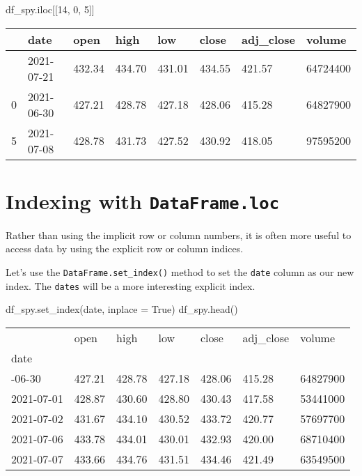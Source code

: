 \documentclass[
  letterpaper,
  DIV=11,
  numbers=noendperiod]{scrreprt}
\newenvironment{Shaded}{\begin{snugshade}}{\end{snugshade}}
\newcommand{\DecValTok}[1]{\textcolor[rgb]{0.68,0.00,0.00}{#1}}
\newcommand{\NormalTok}[1]{\textcolor[rgb]{0.00,0.23,0.31}{#1}}
\newcommand{\OperatorTok}[1]{\textcolor[rgb]{0.37,0.37,0.37}{#1}}
\newcommand{\StringTok}[1]{\textcolor[rgb]{0.13,0.47,0.30}{#1}}
\newcommand{\VariableTok}[1]{\textcolor[rgb]{0.07,0.07,0.07}{#1}}
\begin{document}
\begin{Shaded}
\begin{Highlighting}[]
\NormalTok{df\_spy.iloc[[}\DecValTok{14}\NormalTok{, }\DecValTok{0}\NormalTok{, }\DecValTok{5}\NormalTok{]]}
\end{Highlighting}
\end{Shaded}

\begin{longtable}[]{@{}llllllll@{}}
\toprule\noalign{}
& date & open & high & low & close & adj\_close & volume \\
\midrule\noalign{}
\endhead
\bottomrule\noalign{}
\endlastfoot
14 & 2021-07-21 & 432.34 & 434.70 & 431.01 & 434.55 & 421.57 &
64724400 \\
0 & 2021-06-30 & 427.21 & 428.78 & 427.18 & 428.06 & 415.28 &
64827900 \\
5 & 2021-07-08 & 428.78 & 431.73 & 427.52 & 430.92 & 418.05 &
97595200 \\
\end{longtable}

\hypertarget{indexing-with-dataframe.loc}{%
\section{\texorpdfstring{Indexing with
\texttt{DataFrame.loc}}{Indexing with DataFrame.loc}}\label{indexing-with-dataframe.loc}}

Rather than using the implicit row or column numbers, it is often more
useful to access data by using the explicit row or column indices.

Let's use the \texttt{DataFrame.set\_index()} method to set the
\texttt{date} column as our new index. The \texttt{dates} will be a more
interesting explicit index.

\begin{Shaded}
\begin{Highlighting}[]
\NormalTok{df\_spy.set\_index(}\StringTok{\textquotesingle{}date\textquotesingle{}}\NormalTok{, inplace }\OperatorTok{=} \VariableTok{True}\NormalTok{)}
\NormalTok{df\_spy.head()}
\end{Highlighting}
\end{Shaded}

\begin{longtable}[]{@{}lllllll@{}}
\toprule\noalign{}
& open & high & low & close & adj\_close & volume \\
date & & & & & & \\
\midrule\noalign{}
\endhead
\bottomrule\noalign{}
\endlastfoot
2021-06-30 & 427.21 & 428.78 & 427.18 & 428.06 & 415.28 & 64827900 \\
2021-07-01 & 428.87 & 430.60 & 428.80 & 430.43 & 417.58 & 53441000 \\
2021-07-02 & 431.67 & 434.10 & 430.52 & 433.72 & 420.77 & 57697700 \\
2021-07-06 & 433.78 & 434.01 & 430.01 & 432.93 & 420.00 & 68710400 \\
2021-07-07 & 433.66 & 434.76 & 431.51 & 434.46 & 421.49 & 63549500 \\
\end{longtable}
\end{document}
